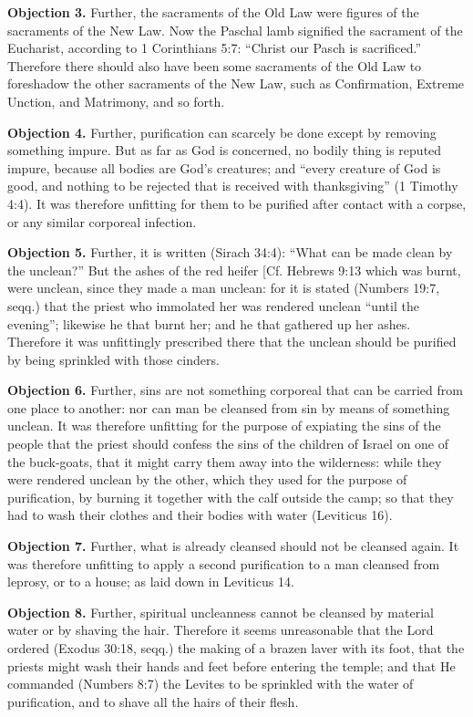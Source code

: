\textbf{Objection 3.} Further, the sacraments of the Old Law were figures of the sacraments of the New Law. Now the Paschal lamb signified the sacrament of the Eucharist, according to 1 Corinthians 5:7: ``Christ our Pasch is sacrificed.'' Therefore there should also have been some sacraments of the Old Law to foreshadow the other sacraments of the New Law, such as Confirmation, Extreme Unction, and Matrimony, and so forth.

\textbf{Objection 4.} Further, purification can scarcely be done except by removing something impure. But as far as God is concerned, no bodily thing is reputed impure, because all bodies are God's creatures; and ``every creature of God is good, and nothing to be rejected that is received with thanksgiving'' (1 Timothy 4:4). It was therefore unfitting for them to be purified after contact with a corpse, or any similar corporeal infection.

\textbf{Objection 5.} Further, it is written (Sirach 34:4): ``What can be made clean by the unclean?'' But the ashes of the red heifer [Cf. Hebrews 9:13 which was burnt, were unclean, since they made a man unclean: for it is stated (Numbers 19:7, seqq.) that the priest who immolated her was rendered unclean ``until the evening''; likewise he that burnt her; and he that gathered up her ashes. Therefore it was unfittingly prescribed there that the unclean should be purified by being sprinkled with those cinders.

\textbf{Objection 6.} Further, sins are not something corporeal that can be carried from one place to another: nor can man be cleansed from sin by means of something unclean. It was therefore unfitting for the purpose of expiating the sins of the people that the priest should confess the sins of the children of Israel on one of the buck-goats, that it might carry them away into the wilderness: while they were rendered unclean by the other, which they used for the purpose of purification, by burning it together with the calf outside the camp; so that they had to wash their clothes and their bodies with water (Leviticus 16).

\textbf{Objection 7.} Further, what is already cleansed should not be cleansed again. It was therefore unfitting to apply a second purification to a man cleansed from leprosy, or to a house; as laid down in Leviticus 14.

\textbf{Objection 8.} Further, spiritual uncleanness cannot be cleansed by material water or by shaving the hair. Therefore it seems unreasonable that the Lord ordered (Exodus 30:18, seqq.) the making of a brazen laver with its foot, that the priests might wash their hands and feet before entering the temple; and that He commanded (Numbers 8:7) the Levites to be sprinkled with the water of purification, and to shave all the hairs of their flesh.

